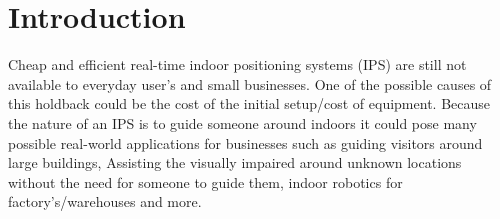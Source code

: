 \section{Introduction }\label{sec:intro}
Cheap and efficient real-time indoor positioning systems (IPS) are still not available to everyday user’s and small businesses. One of the possible causes of this holdback could be the cost of the initial setup/cost of equipment. Because the nature of an IPS is to guide someone around indoors it could pose many possible real-world applications for businesses such as guiding visitors around large buildings, Assisting the visually impaired around unknown locations without the need for someone to guide them, indoor robotics for factory’s/warehouses and more.
